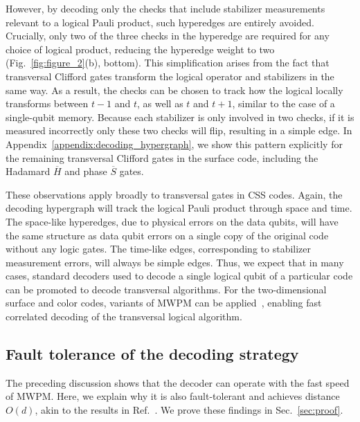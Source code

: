 \documentclass[prx,twocolumn,secnumarabic,balancelastpage,amsmath,amssymb,longbibliography]{revtex4-2}
\newcommand{\lop}[1]{\overline{#1}}
\begin{document}
However, by decoding only the checks that include stabilizer measurements relevant to a logical Pauli product, such hyperedges are entirely avoided.
%
Crucially, only two of the three checks in the hyperedge are required for any choice of logical product, reducing the hyperedge weight to two (Fig.~\ref{fig:figure_2}(b), bottom).
%
This simplification arises from the fact that transversal Clifford gates transform the logical operator and stabilizers in the same way.
%
As a result, the checks can be chosen to track how the logical locally transforms between $t- 1$ and $t$, as well as $t$ and $t+1$, similar to the case of a single-qubit memory.
%
Because each stabilizer is only involved in two checks, if it is measured incorrectly only these two checks will flip, resulting in a simple edge.
%
In Appendix~\ref{appendix:decoding_hypergraph}, we show this pattern explicitly for the remaining transversal Clifford gates in the surface code, including the Hadamard $\lop{H}$ and phase $\lop{S}$ gates.

These observations apply broadly to transversal gates in CSS codes. 
%
Again, the decoding hypergraph will track the logical Pauli product through space and time. 
The space-like hyperedges, due to physical errors on the data qubits, will have the same structure as data qubit errors on a single copy of the original code without any logic gates. 
%
The time-like edges, corresponding to stabilizer measurement errors, will always be simple edges. 
%
Thus, we expect that in many cases, standard decoders used to decode a single logical qubit of a particular code can be promoted to decode transversal algorithms. 
%
For the two-dimensional surface and color codes, variants of MWPM can be applied~\cite{dennis2002topological,kubica2023efficient,delfosse2014decoding,lee2025color,gidney2023new}, enabling fast correlated decoding of the transversal logical algorithm. 

\subsection{Fault tolerance of the decoding strategy \label{subsec:fault_tolerance}}
The preceding discussion shows that the decoder can operate with the fast speed of MWPM.
%
Here, we explain why it is also fault-tolerant and achieves distance $O(d)$, akin to the results in Ref.~\cite{zhou2024algorithmic}.
%
We prove these findings in Sec.~\ref{sec:proof}.
\end{document}

